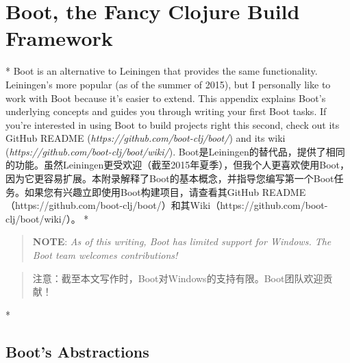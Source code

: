 \chapter{Boot, the Fancy Clojure Build Framework}

\begin{paracol}{2}
\switchcolumn[0]*
Boot is an alternative to Leiningen that provides the same
functionality. Leiningen's more popular (as of the summer of 2015), but
I personally like to work with Boot because it's easier to extend. This
appendix explains Boot's underlying concepts and guides you through
writing your first Boot tasks. If you're interested in using Boot to
build projects right this second, check out its GitHub README
(\emph{https://github.com/boot-clj/boot/}) and its wiki
(\emph{https://github.com/boot-clj/boot/wiki/}).
\switchcolumn
Boot是Leiningen的替代品，提供了相同的功能。虽然Leiningen更受欢迎（截至2015年夏季），但我个人更喜欢使用Boot，因为它更容易扩展。本附录解释了Boot的基本概念，并指导您编写第一个Boot任务。如果您有兴趣立即使用Boot构建项目，请查看其GitHub README（https://github.com/boot-clj/boot/）和其Wiki（https://github.com/boot-clj/boot/wiki/）。
\switchcolumn[0]*
\begin{quote}
\textbf{NOTE}:
\emph{As of this writing, Boot has limited support for Windows. The Boot
team welcomes contributions!}
\end{quote}
\switchcolumn
\begin{quote}
注意：截至本文写作时，Boot对Windows的支持有限。Boot团队欢迎贡献！
\end{quote}
\switchcolumn[0]*
\section{Boot's Abstractions}
\switchcolumn

\end{paracol}
